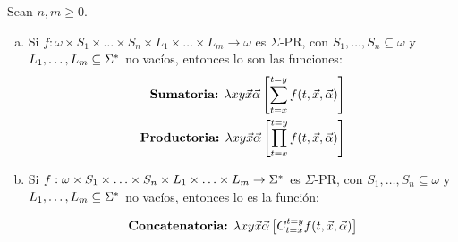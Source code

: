   \begin{lemma}
    \PN Sean $n, m \geq 0$.

    \begin{enumerate}[a)]
      \item Si $f: \omega \times S_{1} \times \dotsc \times S_{n} \times L_{1} \times \dotsc \times L_{m} \rightarrow
        \omega$ es $\Sigma$-PR, con $ S_{1}, \dotsc, S_{n} \subseteq \omega$ y $L_{1}, \dotsc, L_{m} \subseteq \Sigma^{\ast}$
        no vacíos, entonces lo son las funciones:
        \begin{eqnarray*}
          \text{\textbf{Sumatoria:} } \lambda xy\vec{x}\vec{\alpha} \left[\sum_{t=x}^{t=y} f(t,\vec{x},\vec{\alpha})
            \right] \\
          \text{\textbf{Productoria:} } \lambda xy\vec{x}\vec{\alpha} \left[\prod_{t=x}^{t=y}f(t,\vec{x},\vec{\alpha})
            \right]
        \end{eqnarray*}

      \item Si $f: \omega \times S_{1} \times \dotsc \times S_{n} \times L_{1} \times \dotsc \times L_{m} \rightarrow
        \Sigma^{\ast}$ es $\Sigma$-PR, con $ S_{1}, \dotsc, S_{n} \subseteq \omega$ y $L_{1}, \dotsc, L_{m} \subseteq \Sigma^{\ast}$
        no vacíos, entonces lo es la función:

        \[
          \text{\textbf{Concatenatoria:} } \lambda xy\vec{x}\vec{\alpha}\left[C_{t=x}^{t=y} f(t,\vec{x},\vec{\alpha})
            \right]
        \]
    \end{enumerate}
  \end{lemma}

